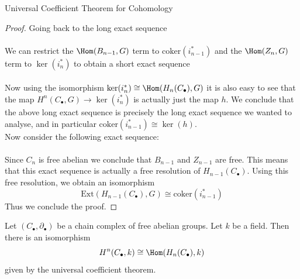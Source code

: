 \documentclass[a4paper]{article}
\begin{document}
\begin{thm}{Universal Coefficient Theorem for Cohomology}{}
\begin{proof}
Going back to the long exact sequence \\
\\
We can restrict the $\Hom(B_{n-1},G)$ term to $\text{coker}(i_{n-1}^\ast)$ and the $\Hom(Z_n,G)$ term to $\ker(i_n^\ast)$ to obtain a short exact sequence \\
\\
Now using the isomorphism $\ker(i_n^\ast)\cong\Hom(H_n(C_\bullet),G)$ it is also easy to see that the map $H^n(C_\bullet,G)\to\ker(i_n^\ast)$ is actually just the map $h$. We conclude that the above long exact sequence is precisely the long exact sequence we wanted to analyse, and in particular $\text{coker}(i_{n-1}^\ast)\cong\ker(h)$. \\

Now consider the following exact sequence: \\
\\
Since $C_n$ is free abelian we conclude that $B_{n-1}$ and $Z_{n-1}$ are free. This means that this exact sequence is actually a free resolution of $H_{n-1}(C_\bullet)$. Using this free resolution, we obtain an isomorphism $$\text{Ext}(H_{n-1}(C_\bullet),G)\cong\text{coker}(i_{n-1}^\ast)$$ Thus we conclude the proof. 
\end{proof}
\end{thm}

\begin{crl}{}{} Let $(C_\bullet,\partial_\bullet)$ be a chain complex of free abelian groups. Let $k$ be a field. Then there is an isomorphism $$H^n(C_\bullet,k)\cong\Hom(H_n(C_\bullet),k)$$ given by the universal coefficient theorem. 
\end{crl}
\end{document}
